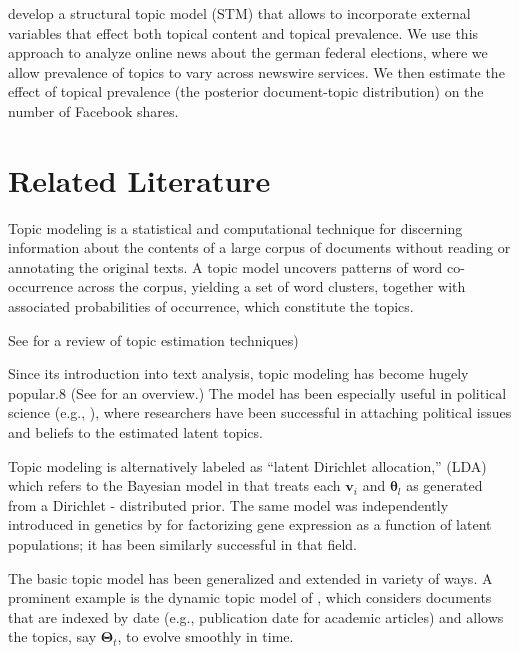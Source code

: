 \documentclass[12pt,a4paper,notitlepage]{article}
\begin{document}
\citet{roberts_model_2016} develop a structural topic model (STM) that allows to incorporate external variables that effect both topical content and topical prevalence. We use this approach to analyze online news about the german federal elections, where we allow prevalence of topics to vary across newswire services. We then estimate the effect of topical prevalence (the posterior document-topic distribution) on the number of Facebook shares. 


\section{Related Literature}




Topic modeling is a statistical and computational technique for discerning information about the contents of a large corpus of documents without reading or annotating the original texts. A topic model uncovers patterns of word co-occurrence across the corpus, yielding a set of word clusters, together with associated probabilities of occurrence, which constitute the topics.

See \citep{taddy_estimation_2012} for a review of topic estimation techniques)

Since its introduction into text analysis, topic modeling has become hugely popular.8 (See \citet{blei_probabilistic_2012} for an overview.) The model has been especially useful in political science (e.g., \citep{grimmer_bayesian_2010}), where researchers have been successful in attaching political issues and beliefs to the estimated latent topics.

Topic modeling is alternatively labeled as “latent Dirichlet allocation,” (LDA) which refers to the Bayesian model in \citet{blei_latent_2003} that treats each $\boldsymbol{v}_i$ and $\boldsymbol{\theta}_l$ as generated from a Dirichlet - distributed prior.
The same model was independently introduced in genetics by \citet{pritchard_inference_2000} for factorizing gene expression as a function of latent populations; it has been similarly successful in that field. 

The basic topic model has been generalized and extended in variety of ways. A prominent example is the dynamic topic model of \citet{blei_dynamic_2006}, which considers documents that are indexed by date (e.g., publication date for academic articles) and allows the topics, say $\boldsymbol{\Theta}_t$, to evolve smoothly in time. 
\end{document}
